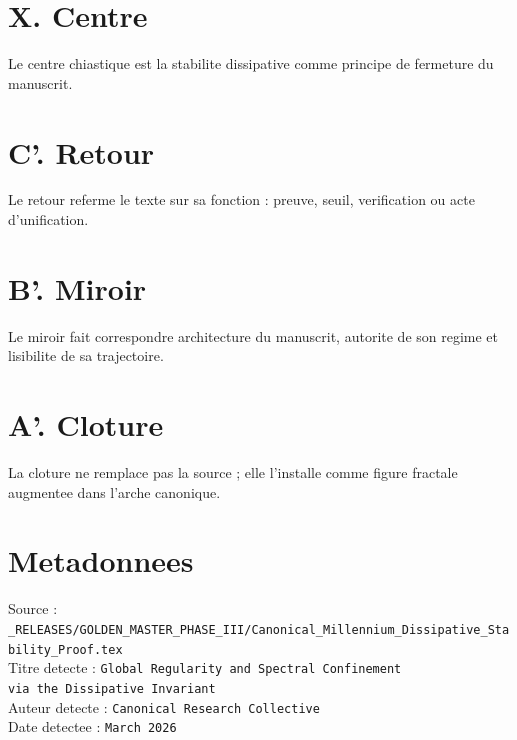 \documentclass[11pt,a4paper]{article}
\begin{document}
\section*{X. Centre}
Le centre chiastique est la stabilite dissipative comme principe de fermeture du manuscrit.

\section*{C'. Retour}
Le retour referme le texte sur sa fonction : preuve, seuil, verification ou acte d'unification.

\section*{B'. Miroir}
Le miroir fait correspondre architecture du manuscrit, autorite de son regime et lisibilite de sa trajectoire.

\section*{A'. Cloture}
La cloture ne remplace pas la source ; elle l'installe comme figure fractale augmentee dans l'arche canonique.

\section*{Metadonnees}
Source : \verb|_RELEASES/GOLDEN_MASTER_PHASE_III/Canonical_Millennium_Dissipative_Stability_Proof.tex|\\
Titre detecte : \texttt{Global Regularity and Spectral Confinement\\ via the Dissipative Invariant}\\
Auteur detecte : \texttt{Canonical Research Collective}\\
Date detectee : \texttt{March 2026}
\end{document}
